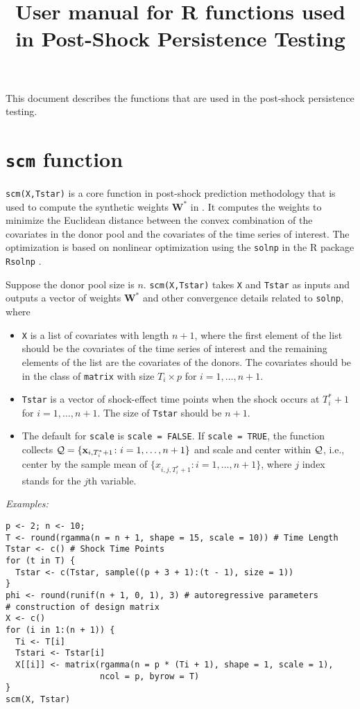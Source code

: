 \documentclass[12pt]{article}
\title{User manual for R functions used in Post-Shock Persistence Testing}
\begin{document}
\maketitle 

This document describes the functions that are used in the post-shock persistence testing.

\tableofcontents

\section{\texttt{scm} function}

\texttt{scm(X,Tstar)} is  a core function in post-shock prediction methodology that is used to compute the synthetic weights $\mathbf{W}^*$ in . It computes the weights to minimize the Euclidean distance between the convex combination of the covariates in the donor pool and the covariates of the time series of interest. The optimization is based on  nonlinear optimization using the \texttt{solnp} in the  R package \texttt{Rsolnp} \cite{ghalanos2012package}.

Suppose the donor pool size is $n$. \texttt{scm(X,Tstar)} takes \texttt{X} and \texttt{Tstar} as inputs and outputs a vector of weights $\mathbf{W}^*$ and other convergence details related to \texttt{solnp}, where
\begin{itemize}
	\item \texttt{X} is a list of covariates with length $n+1$, where the first element of the list should be the covariates of the time series of interest and the remaining elements of the list are the covariates of the donors. The covariates should be in the class of \texttt{matrix} with size $T_i\times p$ for $i = 1, \ldots, n+1$.
	\item \texttt{Tstar} is a vector of shock-effect time points when the shock occurs at $T^*_i+1$ for $i = 1, \ldots, n+1$. The size of \texttt{Tstar} should be $n+1$.
	\item The default for \texttt{scale} is \texttt{scale = FALSE}. If \texttt{scale = TRUE}, the function  collects $\mathcal{Q}=\{\mathbf{x}_{i, T_i^*+1}\colon i = 1, \ldots, n+1\}$ and scale and center within $\mathcal{Q}$, i.e., center by the sample mean of $\{x_{i, j, T_i^*+1} \colon i = 1, \ldots, n+1\}$, where $j$ index stands for the $j$th variable.
\end{itemize}

\emph{Examples:}

\begin{verbatim}
p <- 2; n <- 10;
T <- round(rgamma(n = n + 1, shape = 15, scale = 10)) # Time Length
Tstar <- c() # Shock Time Points
for (t in T) {
  Tstar <- c(Tstar, sample((p + 3 + 1):(t - 1), size = 1))
}
phi <- round(runif(n + 1, 0, 1), 3) # autoregressive parameters
# construction of design matrix
X <- c()
for (i in 1:(n + 1)) {
  Ti <- T[i]
  Tstari <- Tstar[i]
  X[[i]] <- matrix(rgamma(n = p * (Ti + 1), shape = 1, scale = 1),
                   ncol = p, byrow = T) 
}
scm(X, Tstar)
\end{verbatim}
\end{document}
